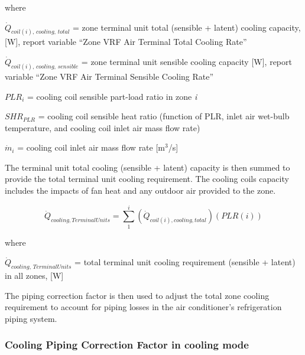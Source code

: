 where

\(\dot{Q}_{coil(i),\,cooling,\,total}\) = zone terminal unit total (sensible + latent) cooling capacity, [W], report variable ``Zone VRF Air Terminal Total Cooling Rate''

\(\dot{Q}_{coil(i),\,cooling,\,sensible}\) = zone terminal unit sensible cooling capacity [W], report variable ``Zone VRF Air Terminal Sensible Cooling Rate''

\(PLR_i\) = cooling coil sensible part-load ratio in zone \emph{i}

\(SHR_{PLR}\) = cooling coil sensible heat ratio (function of PLR, inlet air wet-bulb temperature, and cooling coil inlet air mass flow rate)

\(\dot{m}_{i}\) = cooling coil inlet air mass flow rate [m\(^3\)/s]

The terminal unit total cooling (sensible + latent) capacity is then summed to provide the total terminal unit cooling requirement. The cooling coils capacity includes the impacts of fan heat and any outdoor air provided to the zone.

\begin{equation}
  \dot{Q}_{cooling,TerminalUnits} = \sum\limits_1^i \left( \dot{Q}_{coil(i),cooling,total} \right) \left( PLR(i) \right)
\end{equation}

where

\(\dot{Q}_{cooling,\,TerminalUnits}\) = total terminal unit cooling requirement (sensible + latent) in all zones, [W]

The piping correction factor is then used to adjust the total zone cooling requirement to account for piping losses in the air conditioner's refrigeration piping system.

\subsubsection{Cooling Piping Correction Factor in cooling mode}\label{cooling-piping-correction-factor-in-cooling-mode}

